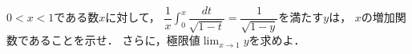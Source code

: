 \documentclass[../../main.tex]{subfiles}
\begin{document}
$0<x<1$である数$x$に対して，
$\displaystyle \dfrac{1}{x}\int_0^x\dfrac{dt}{\sqrt{1-t}}=\dfrac{1}{\sqrt{1-y}}$を満たす$y$は，
$x$の増加関数であることを示せ．
さらに，極限値$\displaystyle\lim_{x \to 1}y$を求めよ．
\end{document}
